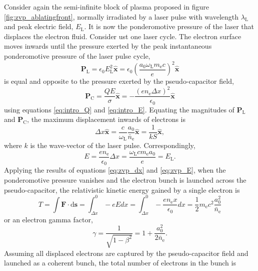Consider again the semi-infinite block of plasma proposed in figure \ref{fig:zvp_ablatingfront}, normally irradiated by a laser pulse with wavelength $\lambda_\mathrm{L}$ and peak electric field, $E_\mathrm{L}$. It is now the ponderomotive pressure of the laser that displaces the electron fluid. Consider ust one laser cycle. The electron surface moves inwards until the pressure exerted by the peak instantaneous ponderomotive pressure of the laser pulse cycle,
\begin{equation}
	\mathbf{P}_\mathrm{L} = \epsilon_0 E^2_\mathrm{L} \hat{\mathbf{x}} = \epsilon_0 \left(\frac{a_0\omega_\mathrm{L}m_\mathrm{e}c}{e}\right)^2 \hat{\mathbf{x}}
\end{equation}
is equal and opposite to the pressure exerted by the pseudo-capacitor field,
\begin{equation}
	\mathbf{P}_\mathrm{C} = \frac{QE}{\sigma} \hat{\mathbf{x}}= -\frac{(en_\mathrm{e}\Delta x)^2}{\epsilon_0}\hat{\mathbf{x}}
\end{equation} 
using equations \ref{eq:intro_Q} and \ref{eq:intro_E}. Equating the magnitudes of $\mathbf{P}_\mathrm{L}$ and $\mathbf{P}_\mathrm{C}$, the maximum displacement inwards of electrons is
\begin{equation}\label{eq:zvp_dx}
	\Delta x \hat{\mathbf{x}} = \frac{c}{\omega_\mathrm{L}}\frac{a_0}{\bar{n}_\mathrm{e}}\hat{\mathbf{x}}  = \frac{1}{kS}\hat{\mathbf{x}},
\end{equation}
where $k$ is the wave-vector of the laser pulse. Correspondingly,
\begin{equation}\label{eq:zvp_E}
	E = \frac{en_\mathrm{e}}{\epsilon_0}\Delta x = \frac{\omega_\mathrm{L}cm_\mathrm{e}a_0}{e} = E_\mathrm{L}.
\end{equation}
Applying the results of equations \ref{eq:zvp_dx} and \ref{eq:zvp_E}, when the ponderomotive pressure vanishes and the electron bunch is launched across the pseudo-capacitor, the relativistic kinetic energy gained by a single electron is
\begin{equation}\label{eq:zvp_T}
	T =  \int \mathbf{F}\cdot\mathrm{d}\mathbf{s} = \int^0_{\Delta x} -eEdx = \int^0_{\Delta x}-\frac{en_\mathrm{e}x}{\epsilon_0}dx = \frac{1}{2}m_\mathrm{e}c^2\frac{a^2_0}{\bar{n}_\mathrm{e}}
\end{equation}
or an electron gamma factor,
\begin{equation}
	\gamma = \frac{1}{\sqrt{1-\beta^2}} = 1 + \frac{a_0^2}{2\bar{n}_\mathrm{e}}.
\end{equation}
Assuming all displaced electrons are captured by the pseudo-capacitor field and launched as a coherent bunch, the total number of electrons in the bunch is
